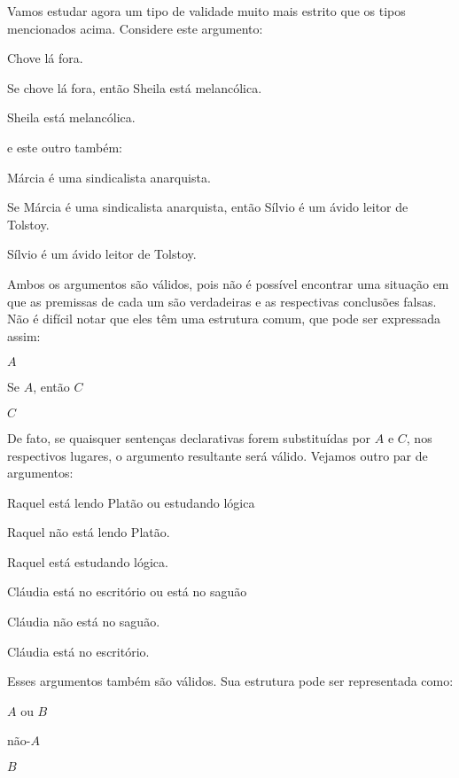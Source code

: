 Vamos estudar agora um tipo de validade muito mais estrito que os tipos mencionados acima. Considere este argumento:
	\begin{earg}
		\item[] Chove lá fora.
		\item[] Se chove lá fora, então Sheila está melancólica.
		\item[\therefore] Sheila está melancólica.
	\end{earg}
e este outro também:
	\begin{earg}
		\item[] Márcia é uma sindicalista anarquista.
		\item[] Se Márcia é uma sindicalista anarquista, então Sílvio é um ávido leitor de Tolstoy.
		\item[\therefore] Sílvio é um ávido leitor de Tolstoy.
	\end{earg}
Ambos os argumentos são válidos, pois não é possível encontrar uma situação em que as premissas de cada um são verdadeiras e as respectivas conclusões falsas. 
Não é difícil notar que eles têm uma estrutura comum, que pode ser expressada assim:
	\begin{earg}
		\item[] $A$
		\item[] Se $A$, então $C$
		\item[\therefore] $C$
	\end{earg}

De fato, se quaisquer sentenças declarativas forem substituídas por $A$ e $C$, nos respectivos lugares, o argumento resultante será válido. 
Vejamos outro par de argumentos:
	\begin{earg}
		\item[] Raquel está lendo Platão ou estudando lógica
		\item[] Raquel não está lendo Platão.
		\item[\therefore] Raquel está estudando lógica.
	\end{earg}
	
	\begin{earg}
		\item[] Cláudia está no escritório ou está no saguão
		\item[] Cláudia não está no saguão.
		\item[\therefore] Cláudia está no escritório.
	\end{earg}

Esses argumentos também são válidos.
Sua estrutura pode ser representada como:
	\begin{earg}
		\item[] $A$ ou $B$
		\item[] não-$A$
		\item[\therefore] $B$
	\end{earg}

